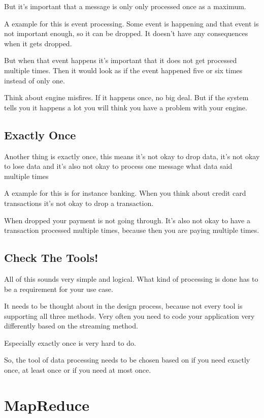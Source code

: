 \documentclass[12pt, numbers=noenddot]{scrreprt} %
\begin{document}
But it’s important that a message is only only processed once as a maximum.

A example for this is event processing. Some event is happening and that event is not important enough, so it can be dropped. It doesn’t have any consequences when it gets dropped.

But when that event happens it’s important that it does not get processed multiple times. Then it would look as if the event happened five or six times instead of only one.

Think about engine misfires. If it happens once, no big deal. But if the system tells you it happens a lot you will think you have a problem with your engine.

\subsection{Exactly Once}

Another thing is exactly once, this means it’s not okay to drop data, it’s not okay to lose data and it’s also not okay to process one message what data said multiple times

A example for this is for instance banking. When you think about credit card transactions it’s not okay to drop a transaction.

When dropped your payment is not going through. It’s also not okay to have a transaction processed multiple times, because then you are paying multiple times.

\subsection{Check The Tools!}

All of this sounds very simple and logical. What kind of processing is done has to be a requirement for your use case.

It needs to be thought about in the design process, because not every tool is supporting all three methods. Very often you need to code your application very differently based on the streaming method.

Especially exactly once is very hard to do.

So, the tool of data processing needs to be chosen based on if you need exactly once, at least once or if you need at most once.



\section{MapReduce}
\end{document}
